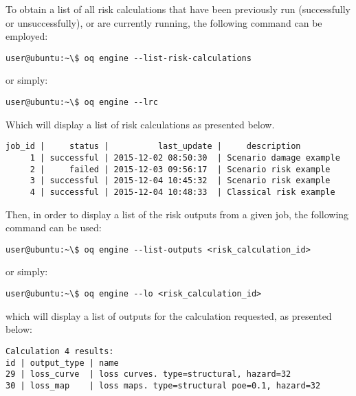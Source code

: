 To obtain a list of all risk calculations that have been previously run
(successfully or unsuccessfully), or are currently running, the following
command can be employed:

\begin{verbatim}
user@ubuntu:~\$ oq engine --list-risk-calculations
\end{verbatim}

or simply:

\begin{verbatim}
user@ubuntu:~\$ oq engine --lrc
\end{verbatim}

Which will display a list of risk calculations as presented below.

\begin{verbatim}
job_id |     status |          last_update |     description
     1 | successful | 2015-12-02 08:50:30  | Scenario damage example
     2 |     failed | 2015-12-03 09:56:17  | Scenario risk example
     3 | successful | 2015-12-04 10:45:32  | Scenario risk example
     4 | successful | 2015-12-04 10:48:33  | Classical risk example
\end{verbatim}

Then, in order to display a list of the risk outputs from a given job, the
following command can be used:

\begin{verbatim}
user@ubuntu:~\$ oq engine --list-outputs <risk_calculation_id>
\end{verbatim}

or simply:

\begin{verbatim}
user@ubuntu:~\$ oq engine --lo <risk_calculation_id>
\end{verbatim}

which will display a list of outputs for the calculation requested, as
presented below:

\begin{verbatim}
Calculation 4 results:
id | output_type | name
29 | loss_curve  | loss curves. type=structural, hazard=32
30 | loss_map    | loss maps. type=structural poe=0.1, hazard=32
\end{verbatim}

